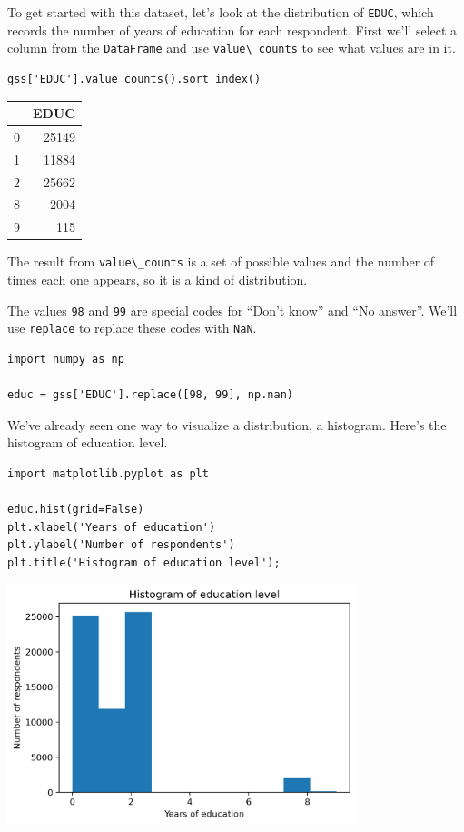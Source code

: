 To get started with this dataset, let's look at the distribution of
\passthrough{\lstinline!EDUC!}, which records the number of years of
education for each respondent. First we'll select a column from the
\passthrough{\lstinline!DataFrame!} and use
\passthrough{\lstinline!value\_counts!} to see what values are in it.

\begin{lstlisting}[]
gss['EDUC'].value_counts().sort_index()
\end{lstlisting}

\begin{tabular}{lr}
\midrule
{} &   EDUC \\
\midrule
0 &  25149 \\
1 &  11884 \\
2 &  25662 \\
8 &   2004 \\
9 &    115 \\
\midrule
\end{tabular}

The result from \passthrough{\lstinline!value\_counts!} is a set of
possible values and the number of times each one appears, so it is a
kind of distribution.

The values \passthrough{\lstinline!98!} and \passthrough{\lstinline!99!}
are special codes for ``Don't know'' and ``No answer''. We'll use
\passthrough{\lstinline!replace!} to replace these codes with
\passthrough{\lstinline!NaN!}.

\begin{lstlisting}[]
import numpy as np

educ = gss['EDUC'].replace([98, 99], np.nan)
\end{lstlisting}

We've already seen one way to visualize a distribution, a histogram.
Here's the histogram of education level.

\begin{lstlisting}[]
import matplotlib.pyplot as plt

educ.hist(grid=False)
plt.xlabel('Years of education')
plt.ylabel('Number of respondents')
plt.title('Histogram of education level');
\end{lstlisting}

\begin{center}
\includegraphics[width=4in]{chapters/08_distributions_files/08_distributions_34_0.png}
\end{center}

